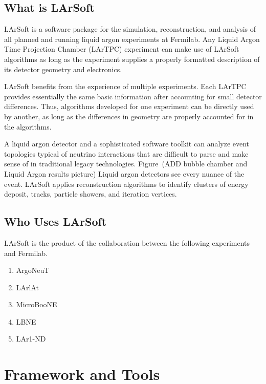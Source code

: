 \documentclass[12pt]{elsarticle}
\begin{document}
\subsection{What is LArSoft}
LArSoft is a software package for the simulation, reconstruction, and analysis of all planned and running liquid argon experiments at Fermilab. Any Liquid Argon Time Projection Chamber (LArTPC) experiment can make use of LArSoft algorithms as long as the experiment supplies a properly formatted description of its detector geometry and electronics. 

LArSoft  benefits from the experience of multiple experiments.  Each LArTPC provides essentially the same basic information after accounting for small detector differences.  Thus, algorithms developed for one experiment can be directly used by another, as long as the differences in geometry are properly accounted for in the algorithms.  

A liquid argon detector and a sophisticated software toolkit can analyze event topologies typical of neutrino interactions that are difficult to parse and make sense of in traditional legacy technologies. Figure~(ADD bubble chamber and Liquid Argon results picture)
Liquid argon detectors see every nuance of the event. LArSoft applies reconstruction algorithms to identify clusters of energy deposit, tracks, particle showers, and iteration vertices.

\subsection{Who Uses LArSoft}
LArSoft is the product of the collaboration between the following experiments and Fermilab.
\begin{enumerate}
\item ArgoNeuT
\item LArlAt
\item MicroBooNE
\item LBNE
\item LAr1-ND
\end{enumerate}

\hspace*{2cm}
\begin{figure}[h]
\centering
\label{bubble}
\end{figure}


\section{Framework and Tools}
\end{document}
